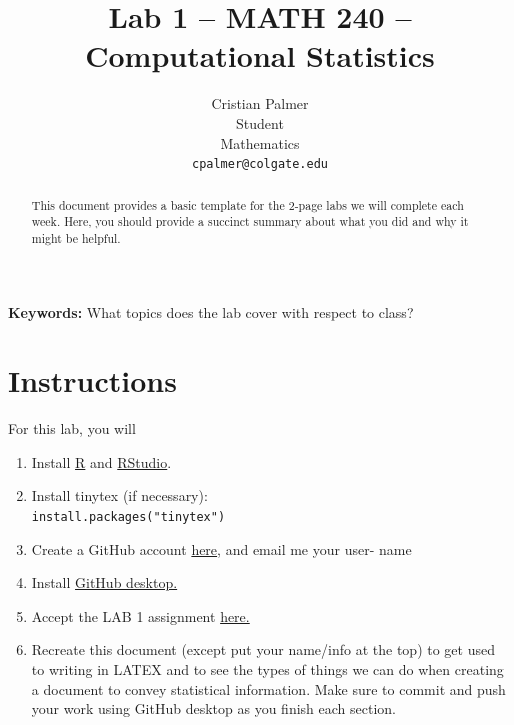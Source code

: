 \documentclass{article}\usepackage[]{graphicx}\usepackage[]{xcolor}
\begin{document}
\vspace{-1in}
\title{Lab 1 -- MATH 240 -- Computational Statistics}

\author{
  Cristian Palmer \\
  Student  \\
  Mathematics  \\
  {\tt cpalmer@colgate.edu}
}

\date{}

\maketitle

\begin{multicols}{2}
\begin{abstract}
This document provides a basic template for the 2-page labs we will complete each week. Here, you should provide a succinct summary about what you did and why it might be helpful.
\end{abstract}

\textbf{Keywords:} What topics does the lab cover with respect to class?

\section{Instructions}
For this lab, you will
\begin{enumerate}[1.]\itemsep0em
\item Install \href{https://cran.rstudio.com/}{R} and \href{https://posit.co/download/rstudio-desktop/}{RStudio}.
\item Install tinytex (if necessary): \\ \texttt{install.packages("tinytex")}
\item Create a GitHub account \href{https://github.com/}{here}, and email me your user- name
\item Install \href{https://github.com/apps/desktop}{GitHub desktop.}
\item Accept the LAB 1 assignment \href{https://classroom.github.com/assignment-invitations/49ec7c38806e92bfef8bf3094b9b11d3}{here.}
\item Recreate this document (except put your name/info at the top) to get used to writing in LATEX and to see the types of things we can do when creating a document to convey statistical information. Make sure to commit and push your work using GitHub desktop as you finish each section.
\end{enumerate}


\end{multicols}
\end{document}
